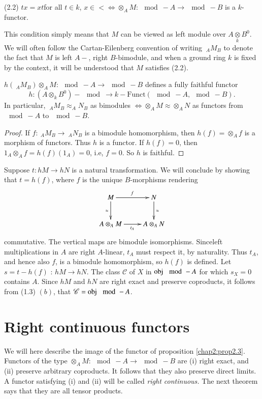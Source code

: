 (2.2) \quad $tx = xt$\pageoriginale for  all $t \in k$, $x \in <
\Leftrightarrow \otimes_A 
M : \mod - A \to \mod - B$ is a $k$-functor. 

This condition simply means that $M$ can be viewed as left module over
$A \underset{k}\otimes B^0$. We will often follow the Cartan-Eilenberg
convention of writing $~_A M_{B}$ to denote the fact that $M$ is left
$A-$, right $B$-bimodule, and when a ground ring $k$ is fixed by the
context, it will be understood that $M$ satisfies (2.2).  

\setcounter{prop}{2}
\begin{prop}\label{chap2:prop2.3}%
$h(~_AM_{B})  \otimes_A M : \mod - A \to \mod - B$ defines a fully
  faithful functor  
$$
h : (A \otimes _k B^0)- \mod \to k-\text{Funct} (\mod-A, \mod-B).  
$$
In particular, $~_A M_B \approx _A N_B$ as bimodules $\Leftrightarrow
\otimes_A M \approx  \otimes_A N$ as functors from $\mod - A$ to
$\mod - B$. 
\end{prop}

\begin{proof}
If $f : ~_A M_B \to ~_AN_B$ is a bimodule homomorphism, then $h(f) =
\otimes_Af$ is a morphism of functors. Thus $h$ is a functor. If
$h(f)= 0$, then $1_A \otimes_A f = h(f) (1_A) = 0$, i.e, $f = 0$. So
$h$ is faithful.  
\end{proof}

Suppose $t : hM \to hN$ is a natural transformation. We will conclude
by showing that $t = h(f)$, where $f$ is the unique $B$-morphisms
rendering 
\[
\xymatrix{
M \ar[r]^f \ar[d]_{\approx} & N \ar[d]^{\approx}\\
A \otimes_A M \ar[r]_{t_A} & A \otimes_A N
}
\]
commutative. The vertical maps are bimodule
isomorphisms. Since\pageoriginale left 
multiplications in $A$ are right $A$-linear, $t_A$ must respect it, by
naturality. Thus $t_A$, and hence also $f$, is a bimodule homomorphism,
so $h(f)$ is defined. Let $ s = t - h(f)$ : $h M \to hN$. The class
$\mathscr{C}$ of $X$ in $\operatorname{obj} \mod - A$  for which $s_X = 0$ contains
$A$. Since $hM$ and $hN$ are right exact and preserve coproducts, it
follows from (1.3) $(b)$, that $\mathscr{C} = \operatorname{obj} \mod - A$.  


\section{Right continuous functors} %

We will here describe the image of the functor of proposition
\ref{chap2:prop2.3}. Functors of the type $\otimes _A M : \mod- A \to
\mod -B$ are (i) 
right exact, and (ii) preserve arbitrary coproducts. It follows that
they also preserve direct limits. A functor satisfying (i) and (ii)
will be called \textit{right continuous.} The next theorem says that
they are all tensor products.  


